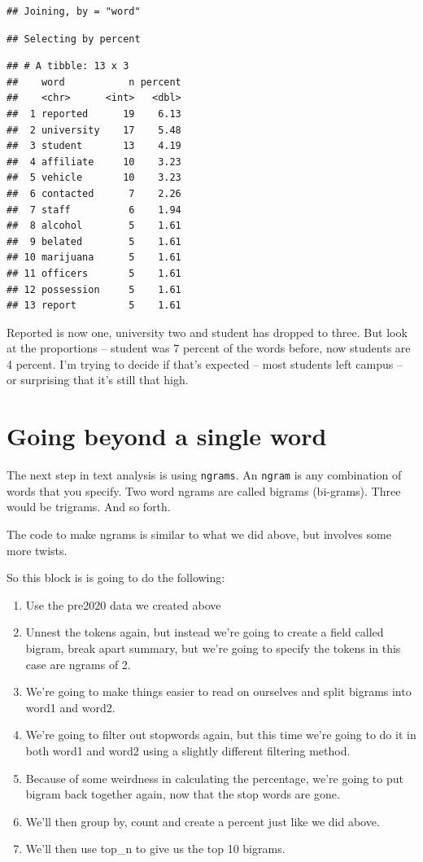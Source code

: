 \documentclass[]{book}
\providecommand{\tightlist}{%
  \setlength{\itemsep}{0pt}\setlength{\parskip}{0pt}}
\begin{document}
\begin{verbatim}
## Joining, by = "word"
\end{verbatim}

\begin{verbatim}
## Selecting by percent
\end{verbatim}

\begin{verbatim}
## # A tibble: 13 x 3
##    word           n percent
##    <chr>      <int>   <dbl>
##  1 reported      19    6.13
##  2 university    17    5.48
##  3 student       13    4.19
##  4 affiliate     10    3.23
##  5 vehicle       10    3.23
##  6 contacted      7    2.26
##  7 staff          6    1.94
##  8 alcohol        5    1.61
##  9 belated        5    1.61
## 10 marijuana      5    1.61
## 11 officers       5    1.61
## 12 possession     5    1.61
## 13 report         5    1.61
\end{verbatim}

Reported is now one, university two and student has dropped to three. But look at the proportions -- student was 7 percent of the words before, now students are 4 percent. I'm trying to decide if that's expected -- most students left campus -- or surprising that it's still that high.

\hypertarget{going-beyond-a-single-word}{%
\section{Going beyond a single word}\label{going-beyond-a-single-word}}

The next step in text analysis is using \texttt{ngrams}. An \texttt{ngram} is any combination of words that you specify. Two word ngrams are called bigrams (bi-grams). Three would be trigrams. And so forth.

The code to make ngrams is similar to what we did above, but involves some more twists.

So this block is is going to do the following:

\begin{enumerate}
\def\labelenumi{\arabic{enumi}.}
\tightlist
\item
  Use the pre2020 data we created above
\item
  Unnest the tokens again, but instead we're going to create a field called bigram, break apart summary, but we're going to specify the tokens in this case are ngrams of 2.
\item
  We're going to make things easier to read on ourselves and split bigrams into word1 and word2.
\item
  We're going to filter out stopwords again, but this time we're going to do it in both word1 and word2 using a slightly different filtering method.
\item
  Because of some weirdness in calculating the percentage, we're going to put bigram back together again, now that the stop words are gone.
\item
  We'll then group by, count and create a percent just like we did above.
\item
  We'll then use top\_n to give us the top 10 bigrams.
\end{enumerate}
\end{document}
